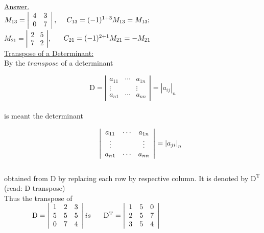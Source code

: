 \documentclass[12pt]{article}
\begin{document}

\underline{Answer.} \\

$ M_{13}=
		\left |
		\begin{array}{cc}
			4 & 3 \\
			0 & 7 
		\end{array}
		\right|,     
\hspace*{3ex}
  C_{13}=
		(-1)^{1+3}M_{13}
		=M_{13}; $ \\
		
$ M_{21}=
		\left |
		\begin{array}{cc}
			2 & 5 \\
			7 & 2 
		\end{array}
		\right|, $
$\hspace*{3ex} 
  C_{21}=
  		(-1)^{2+1}M_{21}
  		=-M_{21} $ \\


\underline{Transpose of a Determinant:} \\

By the $transpose$ of a determinant 

$$ \mathrm{D} = 
	\left |
	\begin{array}{ccc}
		a_{11} & \cdots & a_{1n} \\
		\vdots & & \vdots \\
		a_{n1} & \cdots & a_{nn}  
	\end{array}
	\right|={|a_{ij}|}_{n} $$\\
is meant the determinant 

$$ \hspace*{5ex} 
	\left |
	\begin{array}{ccc}
		a_{11} & \cdots & a_{1n} \\
		\vdots & & \vdots \\
		a_{n1} & \cdots & a_{nn}  
	\end{array}
	\right|
		={|a_{ji}|}_{n} $$ \\
obtained from D by replacing each row by respective column. It is denoted by $\mathrm{D^T}$ (read: D transpose)\\

Thus the transpose of \\ 

$\hspace*{9ex} 	
  \mathrm{D}=
  	\left |
	\begin{array}{ccc}
		1 & 2 & 3 \\
		5 & 5 & 5 \\
		0 & 7 & 4
	\end{array}
	\right| is $ 
$\hspace*{3ex} 
  \mathrm{D^T}=
  	\left |
	\begin{array}{ccc}
		1 & 5 & 0 \\
		2 & 5 & 7 \\
		3 & 5 & 4
	\end{array}
	\right| $ \\ \\
\end{document}
